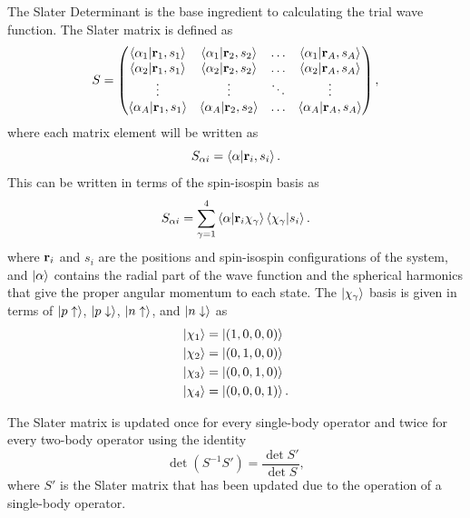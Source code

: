 The Slater Determinant is the base ingredient to calculating the trial wave function. The Slater matrix is defined as
\begin{equation}
   S = \begin{pmatrix}
      \left< \alpha_1 | \mathbf{r}_1,s_1 \right> & \left< \alpha_1 | \mathbf{r}_2,s_2 \right> & \ldots & \left< \alpha_1 | \mathbf{r}_A,s_A \right> \\
      \left< \alpha_2 | \mathbf{r}_1,s_1 \right> & \left< \alpha_2 | \mathbf{r}_2,s_2 \right> & \ldots & \left< \alpha_2 | \mathbf{r}_A,s_A \right> \\
      \vdots & \vdots & \ddots & \vdots \\
      \left< \alpha_A | \mathbf{r}_1,s_1 \right> & \left< \alpha_A | \mathbf{r}_2,s_2 \right> & \ldots & \left< \alpha_A | \mathbf{r}_A,s_A \right>
   \end{pmatrix},
\end{equation}
where each matrix element will be written as
\begin{equation}
   S_{\alpha i} = \left< \alpha | \mathbf{r}_i,s_i \right>.
\end{equation}
This can be written in terms of the spin-isospin basis as
\begin{equation}
   S_{\alpha i} = \sum\limits_{\gamma=1}^4 \left< \alpha | \mathbf{r}_i \chi_\gamma \right>\left< \chi_\gamma | s_i \right>.
\end{equation}
where $\mathbf{r}_i$ and $s_i$ are the positions and spin-isospin configurations of the system, and $\left| \alpha \right>$ contains the radial part of the wave function and the spherical harmonics that give the proper angular momentum to each state. The $\left| \chi_\gamma \right>$ basis is given in terms of $\left| p\uparrow \right>$, $\left| p\downarrow \right>$, $\left| n\uparrow \right>$, and $\left| n\downarrow \right>$ as
\begin{equation}
\begin{split}
   \left| \chi_1 \right> &= \left| \left(1,0,0,0\right) \right> \\
   \left| \chi_2 \right> &= \left| \left(0,1,0,0\right) \right> \\
   \left| \chi_3 \right> &= \left| \left(0,0,1,0\right) \right> \\
   \left| \chi_4 \right> &= \left| \left(0,0,0,1\right) \right>.
\end{split}
\end{equation}

The Slater matrix is updated once for every single-body operator and twice for every two-body operator using the identity
\begin{equation}
   \det{\left(S^{-1}S'\right)} = \frac{\det{S'}}{\det S},
   \label{equ:matrixid}
\end{equation}
where $S'$ is the Slater matrix that has been updated due to the operation of a single-body operator.


